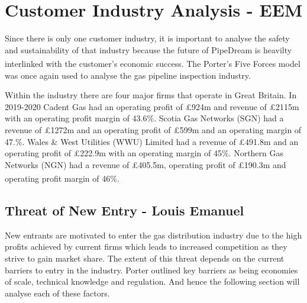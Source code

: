 \documentclass[11pt]{article}		%
\newcommand{\supercite}[1]{\textsuperscript{\cite{#1}}}		%
\begin{document}
	\section{Customer Industry Analysis - EEM}

		Since there is only one customer industry, it is important to analyse the safety and sustainability of that industry because the future of PipeDream is heavilty interlinked with the customer's economic success.
		The Porter's Five Forces model\supercite{porter2008five} was once again used to analyse the gas pipeline inspection industry.
		
		Within the industry there are four major firms that operate in Great Britain. In 2019-2020 Cadent Gas had an operating profit of £924m and revenue of £2115m with an operating profit margin of 43.6\%. Scotia Gas Networks (SGN) had a revenue of £1272m and an operating profit of £599m and an operating margin of 47.\%. Wales \& West Utilities (WWU) Limited had a revenue of £491.8m and an operating profit of £222.9m with an operating margin of 45\%. Northern Gas Networks (NGN) had a revenue of £405.5m, operating profit of £190.3m and operating profit margin of 46\%.  \supercite{Gas_Distribution_Industry}
			
		\subsection[Threat of New Entry]{Threat of New Entry - Louis Emanuel}
				New entrants are motivated to enter the gas distribution industry due to the high profits achieved by current firms which leads to increased competition as they strive to gain market share. The extent of this threat depends on the current barriers to entry in the industry. Porter outlined key barriers as being economies of scale, technical knowledge and regulation. And hence the following section will analyse each of these factors. \\
				
\end{document}
